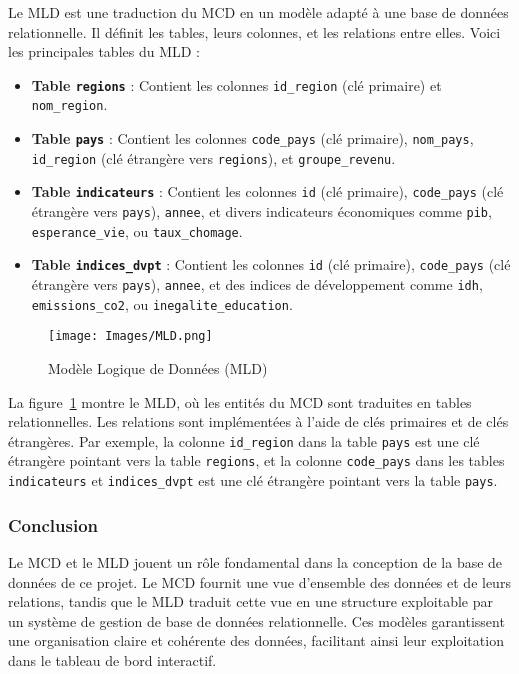 \documentclass[11pt]{article}
\begin{document}
Le MLD est une traduction du MCD en un modèle adapté à une base de données relationnelle. Il définit les tables, leurs colonnes, et les relations entre elles. Voici les principales tables du MLD :

\begin{itemize}
  \item \textbf{Table \texttt{regions}} : Contient les colonnes \texttt{id\_region} (clé primaire) et \texttt{nom\_region}.
  \item \textbf{Table \texttt{pays}} : Contient les colonnes \texttt{code\_pays} (clé primaire), \texttt{nom\_pays}, \texttt{id\_region} (clé étrangère vers \texttt{regions}), et \texttt{groupe\_revenu}.
  \item \textbf{Table \texttt{indicateurs}} : Contient les colonnes \texttt{id} (clé primaire), \texttt{code\_pays} (clé étrangère vers \texttt{pays}), \texttt{annee}, et divers indicateurs économiques comme \texttt{pib}, \texttt{esperance\_vie}, ou \texttt{taux\_chomage}.
  \item \textbf{Table \texttt{indices\_dvpt}} : Contient les colonnes \texttt{id} (clé primaire), \texttt{code\_pays} (clé étrangère vers \texttt{pays}), \texttt{annee}, et des indices de développement comme \texttt{idh}, \texttt{emissions\_co2}, ou \texttt{inegalite\_education}.
\end{itemize}

\begin{figure}[H]
    \centering
    \texttt{[image: Images/MLD.png]}
    \caption{Modèle Logique de Données (MLD)}
    \label{fig:mld}
\end{figure}

La figure~\ref{fig:mld} montre le MLD, où les entités du MCD sont traduites en tables relationnelles. Les relations sont implémentées à l'aide de clés primaires et de clés étrangères. Par exemple, la colonne \texttt{id\_region} dans la table \texttt{pays} est une clé étrangère pointant vers la table \texttt{regions}, et la colonne \texttt{code\_pays} dans les tables \texttt{indicateurs} et \texttt{indices\_dvpt} est une clé étrangère pointant vers la table \texttt{pays}.

\subsubsection*{Conclusion}

Le MCD et le MLD jouent un rôle fondamental dans la conception de la base de données de ce projet. Le MCD fournit une vue d'ensemble des données et de leurs relations, tandis que le MLD traduit cette vue en une structure exploitable par un système de gestion de base de données relationnelle. Ces modèles garantissent une organisation claire et cohérente des données, facilitant ainsi leur exploitation dans le tableau de bord interactif.
\end{document}
